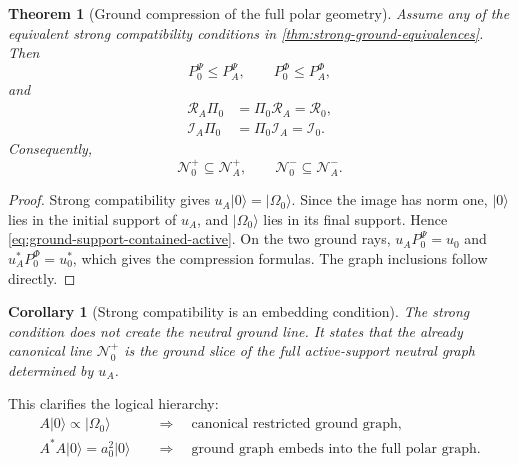 \documentclass[11pt,reqno]{scrartcl}
\newcommand{\PzeroP}{P_{0}^{\Psi}}
\newcommand{\PzeroF}{P_{0}^{\Phi}}
\newcommand{\Pizero}{\Pi_{0}}
\newcommand{\polA}{u_A}
\newcommand{\uzero}{u_{0}}
\newcommand{\Rzero}{\mathcal R_{0}}
\newcommand{\Izero}{\mathcal I_{0}}
\newcommand{\RA}{\mathcal R_{A}}
\newcommand{\IA}{\mathcal I_{A}}
\newcommand{\NzeroPlus}{\mathscr N_{0}^{+}}
\newcommand{\NzeroMinus}{\mathscr N_{0}^{-}}
\newcommand{\ket}[1]{\lvert #1\rangle}
\newcommand{\suppProjP}{P_{A}^{\Psi}}
\newcommand{\suppProjF}{P_{A}^{\Phi}}
\theoremstyle{plain}
\newtheorem{theorem}{Theorem}[section]
\newtheorem{corollary}[corollary]{Corollary}
\theoremstyle{definition}
\theoremstyle{remark}
\begin{document}
\begin{theorem}[Ground compression of the full polar geometry]
\label{thm:ground-compression-full-polar}
Assume any of the equivalent strong compatibility conditions in
\cref{thm:strong-ground-equivalences}.  Then
\begin{equation}
  \PzeroP\le\suppProjP,
  \qquad
  \PzeroF\le\suppProjF,
  \label{eq:ground-support-contained-active}
\end{equation}
and
\begin{align}
  \RA\Pizero
  &=\Pizero\RA=\Rzero,
  \label{eq:R0-compression-RA}\\
  \IA\Pizero
  &=\Pizero\IA=\Izero.
  \label{eq:I0-compression-IA}
\end{align}
Consequently,
\begin{equation}
  \NzeroPlus\subseteq\mathscr N_A^+,
  \qquad
  \NzeroMinus\subseteq\mathscr N_A^-.
  \label{eq:ground-graphs-subset-full-graphs}
\end{equation}
\end{theorem}

\begin{proof}
Strong compatibility gives
\(\polA\ket0=\ket{\Omega_0}\).  Since the image has norm one,
\(\ket0\) lies in the initial support of \(\polA\), and
\(\ket{\Omega_0}\) lies in its final support.  Hence
\eqref{eq:ground-support-contained-active}.  On the two ground rays,
\(\polA\PzeroP=\uzero\) and
\(\polA^*\PzeroF=\uzero^*\), which gives the compression formulas.  The graph
inclusions follow directly.
\end{proof}

\begin{corollary}[Strong compatibility is an embedding condition]
\label{cor:strong-is-embedding-condition}
The strong condition does not create the neutral ground line.  It states that
the already canonical line \(\NzeroPlus\) is the ground slice of the full
active-support neutral graph determined by \(\polA\).
\end{corollary}

This clarifies the logical hierarchy:
\begin{equation}
  \boxed{
  \begin{aligned}
  A\ket0\propto\ket{\Omega_0}
  &\quad\Longrightarrow\quad
  \text{canonical restricted ground graph},\\
  A^*A\ket0=a_0^2\ket0
  &\quad\Longrightarrow\quad
  \text{ground graph embeds into the full polar graph}.
  \end{aligned}}
  \label{eq:weak-strong-hierarchy}
\end{equation}
\end{document}
